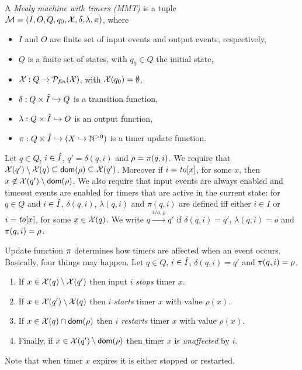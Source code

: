 \begin{definition}
\label{def:MMT}
A \emph{Mealy machine with timers (MMT)} is a tuple
\\
${\cal M} = (I, O, Q, q_0, \mathcal{X}, \delta, \lambda, \pi)$, where
\begin{itemize}
\item
$I$ and $O$ are finite set of input events and output events, respectively,
\item
$Q$ is a finite set of states,
with
$q_0 \in Q$ the initial state,
\item
$\mathcal{X}: Q \rightarrow \cal{P}_{\mathit{fin}}(X)$, with $\mathcal{X}(q_0) = \emptyset$,
\item
$\delta: Q \times \hat{I} \hookrightarrow  Q$ is a transition function,
\item
$\lambda: Q \times \hat{I} \hookrightarrow O$ is an output function, 
\item
$\pi : Q \times \hat{I} \hookrightarrow (X \hookrightarrow {\mathbb N}^{>0})$ is a timer update function.
\end{itemize}
Let $q \in Q$, $i \in \hat{I}$, $q'=\delta(q,i)$ and $\rho=\pi(q,i)$. 
We require that $\mathcal{X}(q') \setminus \mathcal{X}(q) \subseteq {\textsf{dom}}(\rho) \subseteq\mathcal{X}(q')$. Moreover
  if $i=\mathit{to}[x]$, for some $x$, then $x \not\in \mathcal{X}(q') \setminus {\textsf{dom}}(\rho)$.
%
We also require that input events are always enabled and timeout events are enabled
for timers that are active in the current state:
for $q \in Q$ and $i \in \hat{I}$,  $\delta(q,i)$, $\lambda(q,i)$ and $\pi(q,i)$ are defined iff either
$i \in I$ or $i=\mathit{to}[x]$, for some $x \in\mathcal{X}(q)$.
We write $q \xrightarrow{i/o,\rho} q'$ if $\delta(q,i) = q'$, $\lambda(q,i)= o$ and $\pi(q,i) = \rho$.
\end{definition}
Update function $\pi$ determines how timers are affected when an event occurs.
Basically, four things may happen.
Let $q \in Q$, $i \in \hat{I}$, $\delta(q,i)=q'$ and $\pi(q,i)=\rho$.
\begin{enumerate}
\item
If $x \in\mathcal{X}(q) \setminus \mathcal{X}(q')$ then input $i$ \emph{stops} timer $x$.
\item
If $x \in \mathcal{X}(q') \setminus \mathcal{X}(q)$ then $i$ \emph{starts} timer $x$ with value $\rho(x)$.
\item
If $x \in \mathcal{X}(q) \cap {\textsf{dom}}(\rho)$ then $i$ \emph{restarts} timer $x$ with value $\rho(x)$.
\item
Finally, if $x \in \mathcal{X}(q') \setminus {\textsf{dom}}(\rho)$ then timer $x$ is \emph{unaffected} by $i$.
\end{enumerate}
Note that when timer $x$ expires it is either stopped or restarted.


